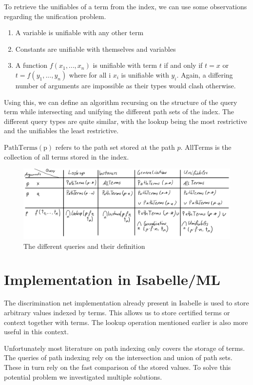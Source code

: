 To retrieve the unifiables of a term from the index, we can use some observations regarding the unification problem.
\begin{enumerate}
  \item A variable is unifiable with any other term
  \item Constants are unifiable with themselves and variables
  \item A function $f(x_{1},...,x_{n})$ is unifiable with term $t$ if and only if $t = x$ or $t = f(y_{1},...,y_{n})$ where for all i $x_{i}$ is unifiable with $y_{i}$. Again, a differing number of arguments are impossible as their types would clash otherwise.
\end{enumerate}
Using this, we can define an algorithm recursing on the structure of the query term while intersecting and unifying the different path sets of the index. The different query types are quite similar, with the lookup being the most restrictive and the unifiables the least restrictive.

$\mathrm{PathTerms(p)}$ refers to the path set stored at the path $p$. $\mathrm{AllTerms}$ is the collection of all terms stored in the index.
\begin{figure}[h]
\centering
\includegraphics[scale=0.25]{figures/queries.png}
\caption{The different queries and their definition}
\end{figure}

\section{Implementation in Isabelle/ML}
The discrimination net implementation already present in Isabelle is used to store arbitrary values indexed by terms. This allows us to store certified terms or context together with terms. The lookup operation mentioned earlier is also more useful in this context.

Unfortunately most literature on path indexing only covers the storage of terms. The queries of path indexing rely on the intersection and union of path sets. These in turn rely on the fast comparison of the stored values. To solve this potential problem we investigated multiple solutions.

